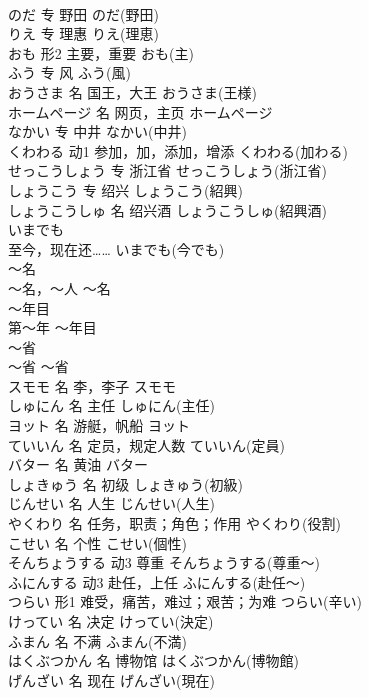 \documentclass[8pt]{extreport}
\begin{document}
\begin{CJK}{UTF8}{min}
\\	のだ	专	野田	のだ(野田)	
\\	りえ	专	理惠	りえ(理恵)	
\\	おも	形2	主要，重要	おも(主)	
\\	ふう	专	风	ふう(風)	
\\	おうさま	名	国王，大王	おうさま(王様)	
\\	ホームページ	名	网页，主页	ホームページ	
\\	なかい	专	中井	なかい(中井)	
\\	くわわる	动1	参加，加，添加，增添	くわわる(加わる)	
\\	せっこうしょう	专	浙江省	せっこうしょう(浙江省)	
\\	しょうこう	专	绍兴	しょうこう(紹興)	
\\	しょうこうしゅ	名	绍兴酒	しょうこうしゅ(紹興酒)	
\\	いまでも	
\\	至今，现在还……	いまでも(今でも)	
\\	～名	
\\	～名，～人	～名	
\\	～年目	
\\	第～年	～年目	
\\	～省	
\\	～省	～省	
\\	スモモ	名	李，李子	スモモ	
\\	しゅにん	名	主任	しゅにん(主任)	
\\	ヨット	名	游艇，帆船	ヨット	
\\	ていいん	名	定员，规定人数	ていいん(定員)	
\\	バター	名	黄油	バター	
\\	しょきゅう	名	初级	しょきゅう(初級)	
\\	じんせい	名	人生	じんせい(人生)	
\\	やくわり	名	任务，职责；角色；作用	やくわり(役割)	
\\	こせい	名	个性	こせい(個性)	
\\	そんちょうする	动3	尊重	そんちょうする(尊重～)	
\\	ふにんする	动3	赴任，上任	ふにんする(赴任～)	
\\	つらい	形1	难受，痛苦，难过；艰苦；为难	つらい(辛い)	
\\	けってい	名	决定	けってい(決定)	
\\	ふまん	名	不满	ふまん(不満)	
\\	はくぶつかん	名	博物馆	はくぶつかん(博物館)	
\\	げんざい	名	现在	げんざい(現在)	

\end{CJK}
\end{document}
